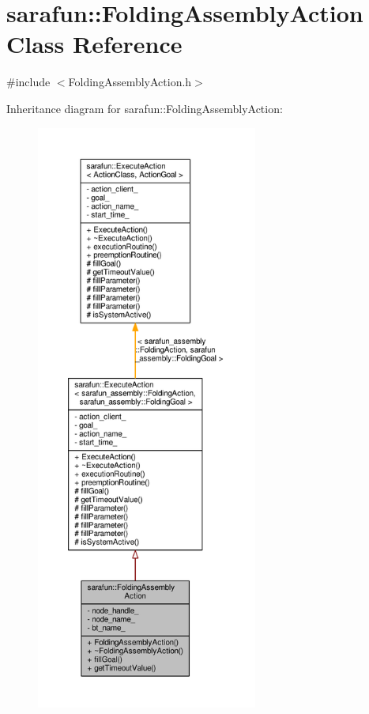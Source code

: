 \hypertarget{classsarafun_1_1FoldingAssemblyAction}{\section{sarafun\-:\-:Folding\-Assembly\-Action Class Reference}
\label{classsarafun_1_1FoldingAssemblyAction}
}


{\ttfamily \#include $<$Folding\-Assembly\-Action.\-h$>$}



Inheritance diagram for sarafun\-:\-:Folding\-Assembly\-Action\-:\nopagebreak
\begin{figure}[H]
\begin{center}
\leavevmode
\includegraphics[height=550pt]{d3/d87/classsarafun_1_1FoldingAssemblyAction__inherit__graph}
\end{center}
\end{figure}


